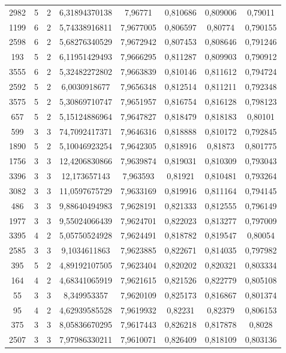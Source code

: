 \begin{longtable}{|c|c|c|c|c|c|c|c|}
2982 & 5 & 2 & 6,31894370138 & 7,96771 & 0,810686 & 0,809006 & 0,79011 \\
1199 & 6 & 2 & 5,74338916811 & 7,9677005 & 0,806597 & 0,80774 & 0,790155 \\
2598 & 6 & 2 & 5,68276340529 & 7,9672942 & 0,807453 & 0,808646 & 0,791246 \\
193 & 5 & 2 & 6,11951429493 & 7,9666295 & 0,811287 & 0,809903 & 0,790912 \\
3555 & 6 & 2 & 5,32482272802 & 7,9663839 & 0,810146 & 0,811612 & 0,794724 \\
2592 & 5 & 2 & 6,0030918677 & 7,9656348 & 0,812514 & 0,811211 & 0,792348 \\
3575 & 5 & 2 & 5,30869710747 & 7,9651957 & 0,816754 & 0,816128 & 0,798123 \\
657 & 5 & 2 & 5,15124886964 & 7,9647827 & 0,818479 & 0,818183 & 0,80101 \\
599 & 3 & 3 & 74,7092417371 & 7,9646316 & 0,818888 & 0,810172 & 0,792845 \\
1890 & 5 & 2 & 5,10046923254 & 7,9642305 & 0,818916 & 0,81873 & 0,801775 \\
1756 & 3 & 3 & 12,4206830866 & 7,9639874 & 0,819031 & 0,810309 & 0,793043 \\
3396 & 3 & 3 & 12,173657143 & 7,963593 & 0,81921 & 0,810481 & 0,793264 \\
3082 & 3 & 3 & 11,0597675729 & 7,9633169 & 0,819916 & 0,811164 & 0,794145 \\
486 & 3 & 3 & 9,88640494983 & 7,9628191 & 0,821333 & 0,812555 & 0,796149 \\
1977 & 3 & 3 & 9,55024066439 & 7,9624701 & 0,822023 & 0,813277 & 0,797009 \\
3395 & 4 & 2 & 5,05750524928 & 7,9624491 & 0,818782 & 0,819547 & 0,80054 \\
2585 & 3 & 3 & 9,1034611863 & 7,9623885 & 0,822671 & 0,814035 & 0,797982 \\
395 & 5 & 2 & 4,89192107505 & 7,9623404 & 0,820202 & 0,820321 & 0,803334 \\
164 & 4 & 2 & 4,68341065919 & 7,9621615 & 0,821526 & 0,822779 & 0,805108 \\
55 & 3 & 3 & 8,349953357 & 7,9620109 & 0,825173 & 0,816867 & 0,801374 \\
95 & 4 & 2 & 4,62939585528 & 7,9619932 & 0,82231 & 0,82379 & 0,806153 \\
375 & 3 & 3 & 8,05836670295 & 7,9617443 & 0,826218 & 0,817878 & 0,8028 \\
2507 & 3 & 3 & 7,97986330211 & 7,9610071 & 0,826409 & 0,818109 & 0,803136 \\

\end{longtable}
